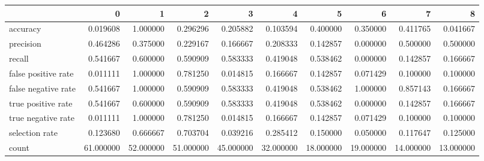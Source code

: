 \begin{tabular}{lrrrrrrrrr}
\toprule
{} &          0 &          1 &          2 &          3 &          4 &          5 &          6 &          7 &          8 \\
\midrule
accuracy            &   0.019608 &   1.000000 &   0.296296 &   0.205882 &   0.103594 &   0.400000 &   0.350000 &   0.411765 &   0.041667 \\
precision           &   0.464286 &   0.375000 &   0.229167 &   0.166667 &   0.208333 &   0.142857 &   0.000000 &   0.500000 &   0.500000 \\
recall              &   0.541667 &   0.600000 &   0.590909 &   0.583333 &   0.419048 &   0.538462 &   0.000000 &   0.142857 &   0.166667 \\
false positive rate &   0.011111 &   1.000000 &   0.781250 &   0.014815 &   0.166667 &   0.142857 &   0.071429 &   0.100000 &   0.100000 \\
false negative rate &   0.541667 &   1.000000 &   0.590909 &   0.583333 &   0.419048 &   0.538462 &   1.000000 &   0.857143 &   0.166667 \\
true positive rate  &   0.541667 &   0.600000 &   0.590909 &   0.583333 &   0.419048 &   0.538462 &   0.000000 &   0.142857 &   0.166667 \\
true negative rate  &   0.011111 &   1.000000 &   0.781250 &   0.014815 &   0.166667 &   0.142857 &   0.071429 &   0.100000 &   0.100000 \\
selection rate      &   0.123680 &   0.666667 &   0.703704 &   0.039216 &   0.285412 &   0.150000 &   0.050000 &   0.117647 &   0.125000 \\
count               &  61.000000 &  52.000000 &  51.000000 &  45.000000 &  32.000000 &  18.000000 &  19.000000 &  14.000000 &  13.000000 \\
\bottomrule
\end{tabular}
